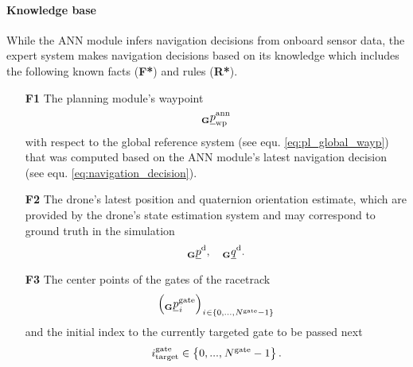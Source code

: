 \paragraph*{Knowledge base} $\ $\\
While the ANN module infers navigation decisions from onboard sensor data,
the expert system makes navigation decisions based on its knowledge
which includes the following known facts (\textbf{F*}) and rules (\textbf{R*}).
\begin{itemize}
    
    \item [\textbf{F1}] 
    The planning module's waypoint
    \begin{equation}
        \pos[]{\text{ann}}{\wayp}{\grs}{}
    \end{equation}
     with respect to the global reference system
    (see equ. \ref{eq:pl_global_wayp}) 
    that was computed based
    on the ANN module's latest navigation decision
    (see equ. \ref{eq:navigation_decision}).
    

    \item [\textbf{F2}] The drone's latest position and quaternion orientation estimate,
    which are provided by the drone's state estimation system and 
    may correspond to ground truth in the simulation
    \begin{equation}
        \pos[]{\drone}{}{\grs}{}
        ,\quad 
        \quat[]{\drone}{}{\grs}{}.
    \end{equation}
    
    \item [\textbf{F3}] The center points of the gates of the racetrack
    \begin{equation}
        \left( 
            \pos[]{\gate}{\idx[]{}{}{}{}}{\grs}{}
        \right)
        _{\idx[]{}{}{}{} \in \left\{0, ..., \num[]{\gate}{}{}{} - 1 \right\}}
    \end{equation}
    and the initial index to the currently targeted gate to be passed next
    \begin{equation}
        \idx[]{\gate}{\target}{}{} \in \left\{0, ..., \num[]{\gate}{}{}{} - 1 \right\}
        .
    \end{equation}


\end{itemize}
